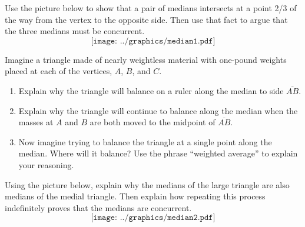 \begin{prob}
Use the picture below to show that a pair of medians intersects at a point 2/3 of the way from the vertex to the opposite side.  Then use that fact to argue that the three medians must be concurrent.  
$$\texttt{[image: ../graphics/median1.pdf]}$$
\end{prob}

\begin{prob}
Imagine a triangle made of nearly weightless material with one-pound weights placed at each of the vertices, $A$, $B$, and $C$.  
\begin{enumerate}
\item Explain why the triangle will balance on a ruler along the median to side $\overline{AB}$.  
\item Explain why the triangle will continue to balance along the median when the masses at $A$ and $B$ are both moved to the midpoint of $\overline{AB}$.  
\item Now imagine trying to balance the triangle at a single point along the median.  Where will it balance?  Use the phrase ``weighted average'' to explain your reasoning.   
\end{enumerate}
\end{prob}

\begin{prob}
Using the picture below, explain why the medians of the large triangle are also medians of the medial triangle.  Then explain how repeating this process indefinitely proves that the medians are concurrent.
$$\texttt{[image: ../graphics/median2.pdf]}$$
\end{prob}
 


